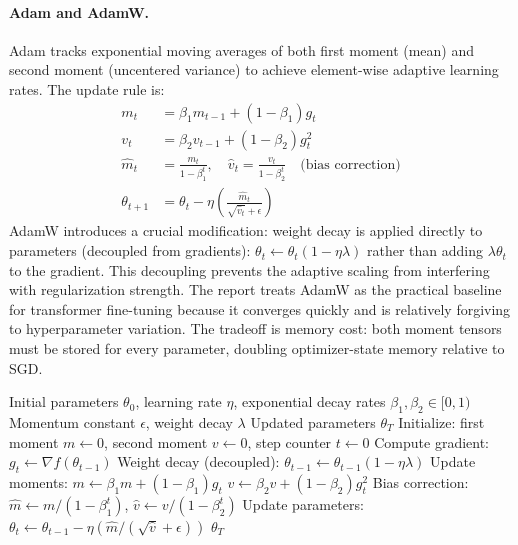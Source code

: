 \paragraph{Adam and AdamW.}
Adam tracks exponential moving averages of both first moment (mean) and second moment (uncentered variance) to achieve element-wise adaptive learning rates. The update rule is:
\begin{align}
m_t &= \beta_1 m_{t-1} + (1-\beta_1) g_t \\
v_t &= \beta_2 v_{t-1} + (1-\beta_2) g_t^2 \\
\hat{m}_t &= \frac{m_t}{1-\beta_1^t}, \quad \hat{v}_t = \frac{v_t}{1-\beta_2^t} \quad \text{(bias correction)} \\
\theta_{t+1} &= \theta_t - \eta \left(\frac{\hat{m}_t}{\sqrt{\hat{v}_t}+\epsilon}\right)
\end{align}
AdamW introduces a crucial modification: weight decay is applied directly to parameters (decoupled from gradients): $\theta_t \gets \theta_t(1-\eta\lambda)$ rather than adding $\lambda\theta_t$ to the gradient. This decoupling prevents the adaptive scaling from interfering with regularization strength. The report treats AdamW as the practical baseline for transformer fine-tuning because it converges quickly and is relatively forgiving to hyperparameter variation. The tradeoff is memory cost: both moment tensors must be stored for every parameter, doubling optimizer-state memory relative to SGD.

\begin{algorithm}[H]
\caption{AdamW (Adam with Decoupled Weight Decay)}
\label{alg:adamw}
\begin{algorithmic}[1]
\Require Initial parameters $\theta_0$, learning rate $\eta$, exponential decay rates $\beta_1, \beta_2 \in [0,1)$
\Require Momentum constant $\epsilon$, weight decay $\lambda$
\Ensure Updated parameters $\theta_T$
\State Initialize: first moment $m \gets 0$, second moment $v \gets 0$, step counter $t \gets 0$
    \State Compute gradient: $g_t \gets \nabla f(\theta_{t-1})$
    \State Weight decay (decoupled): $\theta_{t-1} \gets \theta_{t-1}(1 - \eta\lambda)$
    \State Update moments: $m \gets \beta_1 m + (1-\beta_1) g_t$
    \State $v \gets \beta_2 v + (1-\beta_2) g_t^2$
    \State Bias correction: $\hat{m} \gets m / (1 - \beta_1^t)$, $\hat{v} \gets v / (1 - \beta_2^t)$
    \State Update parameters: $\theta_t \gets \theta_{t-1} - \eta (\hat{m} / (\sqrt{\hat{v}} + \epsilon))$
\EndFor
\Return $\theta_T$
\end{algorithmic}
\end{algorithm}

